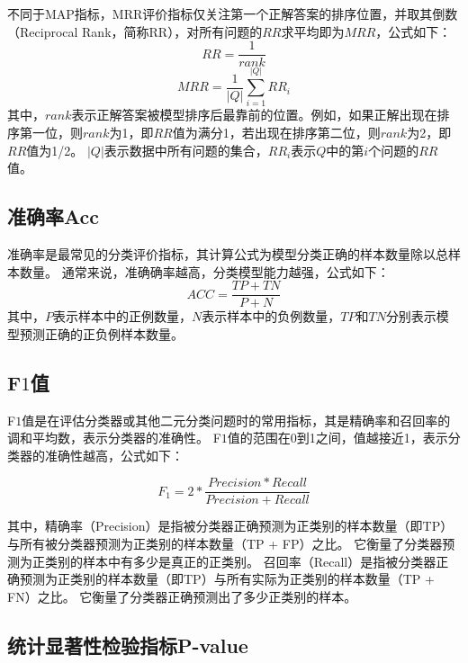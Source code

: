 不同于MAP指标，MRR评价指标仅关注第一个正解答案的排序位置，并取其倒数（Reciprocal Rank，简称RR），对所有问题的$RR$求平均即为$MRR$，公式如下：
\begin{equation}
    RR = \frac{1}{rank}
\end{equation}
\begin{equation}
    MRR = \frac{1}{|Q|} \sum_{i=1}^{|Q|}RR_i
\end{equation}
其中，$rank$表示正解答案被模型排序后最靠前的位置。例如，如果正解出现在排序第一位，则$rank$为1，即$RR$值为满分1，若出现在排序第二位，则$rank$为2，即$RR$值为1/2。
$|Q|$表示数据中所有问题的集合，$RR_i$表示$Q$中的第$i$个问题的$RR$值。



\subsection{准确率Acc}

准确率是最常见的分类评价指标，其计算公式为模型分类正确的样本数量除以总样本数量。
通常来说，准确确率越高，分类模型能力越强，公式如下：
\begin{equation}
    ACC = \frac{TP + TN}{P + N}
\end{equation}
其中，$P$表示样本中的正例数量，$N$表示样本中的负例数量，$TP$和$TN$分别表示模型预测正确的正负例样本数量。


\subsection{F$1$值}
F$1$值是在评估分类器或其他二元分类问题时的常用指标，其是精确率和召回率的调和平均数，表示分类器的准确性。
F$1$值的范围在0到1之间，值越接近1，表示分类器的准确性越高，公式如下：

\begin{equation}
    F_1 = 2 * \frac{Precision * Recall}{Precision + Recall}
\end{equation}

其中，精确率（Precision）是指被分类器正确预测为正类别的样本数量（即TP）与所有被分类器预测为正类别的样本数量（TP + FP）之比。
它衡量了分类器预测为正类别的样本中有多少是真正的正类别。
召回率（Recall）是指被分类器正确预测为正类别的样本数量（即TP）与所有实际为正类别的样本数量（TP + FN）之比。
它衡量了分类器正确预测出了多少正类别的样本。


\subsection{统计显著性检验指标P-value}

